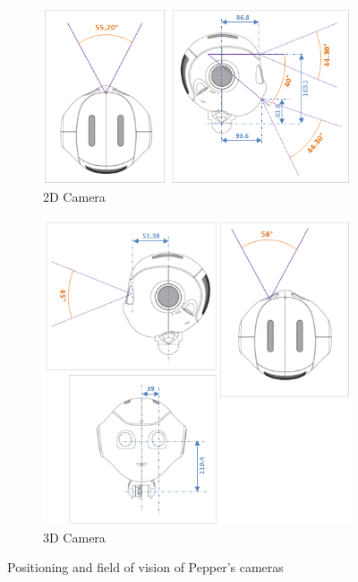 \begin{figure}[H]
\centering
\begin{subfigure}{.48\textwidth}
  \centering
  \includegraphics[width=\linewidth]{Figures/Pepper_Robot/2d_camera.png}
  \caption{2D Camera}
  \label{fig:2d_camera}
\end{subfigure} \hspace*{\fill}
\begin{subfigure}{.48\textwidth}
  \centering
  \includegraphics[width=\linewidth]{Figures/Pepper_Robot/3d_camera.png}
  \caption{3D Camera}
  \label{fig:3d_camera}
\end{subfigure}
\caption{Positioning and field of vision of Pepper's cameras}
\label{fig:cameras}
\end{figure}


